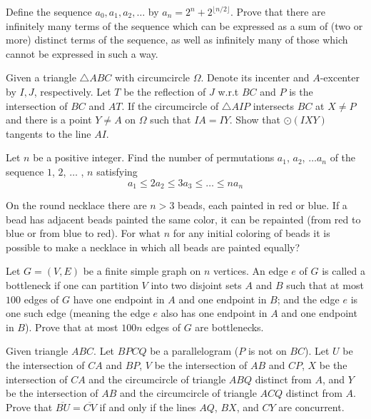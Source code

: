 \documentclass[11pt]{scrartcl}
\begin{document}
\begin{problem}[8609709793627283757]
	Define the sequence $a_0,a_1,a_2,\hdots$ by $a_n=2^n+2^{\lfloor n/2\rfloor}$. Prove that there are infinitely many terms of the sequence which can be expressed as a sum of (two or more) distinct terms of the sequence, as well as infinitely many of those which cannot be expressed in such a way.
\end{problem}
\begin{problem}[836909183133087]
Given a triangle $ \triangle{ABC} $ with circumcircle $ \Omega $. Denote its incenter and $ A $-excenter by $ I, J $, respectively. Let $ T $ be the reflection of $ J $ w.r.t $ BC $ and $ P $ is the intersection of $ BC $ and $ AT $. If the circumcircle of $ \triangle{AIP} $ intersects $ BC $ at $ X \neq P $ and there is a point $ Y \neq A $ on $ \Omega $ such that $ IA = IY $. Show that $ \odot\left(IXY\right) $ tangents to the line $ AI $.
\end{problem}
\begin{problem}[233559801569582]
Let $n$ be a positive integer. Find the number of permutations $a_1$, $a_2$, $\dots a_n$ of the
sequence $1$, $2$, $\dots$ , $n$ satisfying
$$a_1 \le 2a_2\le 3a_3 \le \dots \le na_n$$
\end{problem}
\begin{problem}[6975633259976638169]
On the round necklace there are $n> 3$ beads, each painted in red or blue. If a bead has adjacent beads painted the same color, it can be repainted (from red to blue or from blue to red). For what $n$ for any initial coloring of beads it is possible to make a necklace in which all beads are painted equally?
\end{problem}
\begin{problem}[472882074231586]
Let $G = (V, E)$ be a finite simple graph on $n$ vertices. An edge $e$ of $G$ is called a bottleneck if one can partition $V$ into two disjoint sets $A$ and $B$ such that
at most $100$ edges of $G$ have one endpoint in $A$ and one endpoint in $B$; and
the edge $e$ is one such edge (meaning the edge $e$ also has one endpoint in $A$ and one endpoint in $B$).
Prove that at most $100n$ edges of $G$ are bottlenecks.
\end{problem}
\begin{problem}[302438226120877]
	Given triangle $ABC$. Let $BPCQ$ be a parallelogram ($P$ is not on $BC$). Let $U$ be the intersection of $CA$ and $BP$, $V$ be the intersection of $AB$ and $CP$, $X$ be the intersection of $CA$ and the circumcircle of triangle $ABQ$ distinct from $A$, and $Y$ be the intersection of $AB$ and the circumcircle of triangle $ACQ$ distinct from $A$.
Prove that $\overline{BU} = \overline{CV}$ if and only if the lines $AQ$, $BX$, and $CY$ are concurrent.
\end{problem}
\end{document}
